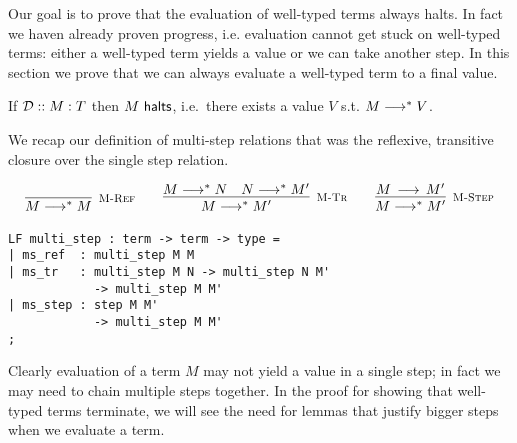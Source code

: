 Our goal is to prove that the evaluation of well-typed terms always halts. In
fact we haven already proven progress, i.e. evaluation cannot get stuck on
well-typed terms: either a well-typed term yields a value or we
can take another step. In this section we prove that we can always
evaluate a well-typed term to a final value.

\begin{theorem}\label{halts}
If $\mathbin{{\mathcal{D}} :: M : T }$ then $M ~\mathsf{halts}$, i.e.~there exists a value $V$ s.t. $M
\longrightarrow^* V$.
\end{theorem}

We recap our definition of multi-step relations that was the
reflexive, transitive closure over the single step relation.

\[
\begin{array}{c@{\qquad}c@{\qquad}c}
\infer[\MRef]{M \MSteps M}{} &
\infer[\MTr]{M \MSteps M'}{M \MSteps N & N \MSteps M'} &
\infer[\MStep]{M \MSteps M'}{M \Steps M'}
\end{array}
\]

\begin{lstlisting}
LF multi_step : term -> term -> type =
| ms_ref  : multi_step M M
| ms_tr   : multi_step M N -> multi_step N M'
            -> multi_step M M'
| ms_step : step M M'
            -> multi_step M M'
;
\end{lstlisting}

Clearly evaluation of a term $M$ may not yield a value in a single step; in fact we may need to chain multiple steps together.
In the proof for showing that well-typed terms terminate, we will see the need for lemmas that justify bigger steps when we evaluate a term.


